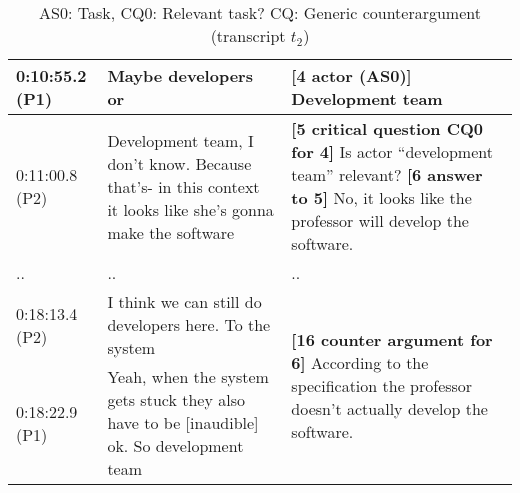 \begin{table}[!htbp]
\begin{tabular}{|p{20mm}|p{60mm}|p{70mm}|}
0:10:55.2 (P1) & Maybe developers or & \textbf{[4 actor (AS0)]} Development team\\
\hline
0:11:00.8 (P2)&Development team, I don't know. Because that's- in this context it looks like she's gonna make the software&\textbf{[5 critical question CQ0 for 4]} Is actor ``development team'' relevant?\newline
\textbf{[6 answer to 5]} No, it looks like the professor will develop the software.\\
\hline
..&..&..\\
\hline
0:18:13.4 (P2) & I think we can still do developers here. To the system & \multirow{2}{70mm}{\textbf{[16 counter argument for 6]} According to the specification the professor doesn't actually develop the software.}\\
\cline{1-2}
0:18:22.9 (P1)&Yeah, when the system gets stuck they also have to be [inaudible] ok. So development team&\\	
\hline	
\end{tabular}
\caption{AS0: Task, CQ0: Relevant task? CQ: Generic counterargument (transcript $t_2$)}
\label{table:transcript:as0-cq0-cq_counterarg}

\end{table}
